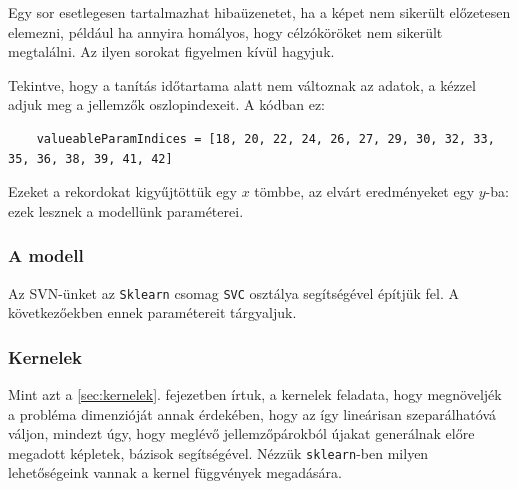 Egy sor esetlegesen tartalmazhat hibaüzenetet, ha a képet nem sikerült előzetesen elemezni, például 
ha annyira homályos, hogy célzóköröket nem sikerült megtalálni. Az ilyen sorokat figyelmen kívül hagyjuk.

Tekintve, hogy a tanítás időtartama alatt nem változnak az adatok, a kézzel adjuk
meg a jellemzők oszlopindexeit. A kódban ez:
\begin{lstlisting}  
	valueableParamIndices = [18, 20, 22, 24, 26, 27, 29, 30, 32, 33, 35, 36, 38, 39, 41, 42]
\end{lstlisting}

Ezeket a rekordokat kigyűjtöttük egy $ x $ tömbbe, az elvárt eredményeket egy $ y $-ba:
ezek lesznek a modellünk paraméterei.



\subsubsection{A modell}

Az SVN-ünket az \texttt{Sklearn} csomag \texttt{SVC} osztálya segítségével építjük fel. A következőekben ennek paramétereit tárgyaljuk.

%
%
%
%




\subsubsection{Kernelek}


Mint azt a \ref{sec:kernelek}. fejezetben írtuk, a kernelek feladata, hogy megnöveljék a probléma
dimenzióját annak érdekében, hogy az így lineárisan szeparálhatóvá váljon, mindezt 
úgy, hogy meglévő jellemzőpárokból újakat generálnak előre megadott képletek,
bázisok segítségével. Nézzük \texttt{sklearn}-ben milyen lehetőségeink vannak a 
kernel függvények megadására.

